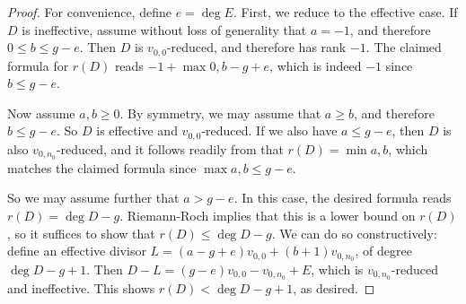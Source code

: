 \documentclass[11pt]{article}
\theoremstyle{definition}
\numberwithin{equation}{section}
\begin{document}
\begin{proof}
    For convenience, define $e = \deg E$. First, we reduce to the effective case. If $D$ is ineffective, assume without loss of generality that $a = -1$, and therefore $0 \leq b \leq g - e$. Then $D$ is $v_{0,0}$-reduced, and therefore has rank $-1$. The claimed formula for $r(D)$ reads $-1 + \max{0, b - g + e }$, which is indeed $-1$ since $b \leq g-e$.

    Now assume $a,b \geq 0$. By symmetry, we may assume that $a \geq b$, and therefore $b \leq g - e$. So $D$ is effective and $v_{0,0}$-reduced. If we also have $a \leq g-e$, then $D$ is also $v_{0,n_0}$-reduced, and it follows readily from  that $r(D) = \min{a,b}$, which matches the claimed formula since $\max{a,b} \leq g-e$. 
    
    So we may assume further that $a > g-e$. In this case, the desired formula reads $r(D) = \deg D - g$. Riemann-Roch implies that this is a lower bound on $r(D)$, so it suffices to show that $r(D) \leq \deg D - g$. We can do so constructively: define an effective divisor $L = (a -g + e)v_{0,0} + (b+1) v_{0,n_0}$, of degree $\deg D -g + 1$. Then $D - L = (g-e) v_{0,0} - v_{0,n_0} + E$, which is $v_{0,n_0}$-reduced and ineffective. This shows $r(D) < \deg D - g + 1$, as desired.
\end{proof}
\end{document}
